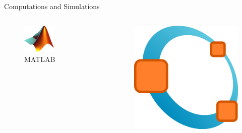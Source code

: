 \documentclass[10pt]{beamer}
\begin{document}
    \begin{frame}{Computations and Simulations}
        \begin{columns}
            \begin{column}{0.5\textwidth}
                \begin{figure}
                    \includegraphics[width=0.5\textwidth]{images/matlab}
                    \caption{MATLAB}
                \end{figure}
            \end{column}
            \vrule{}
            \begin{column}{0.5\textwidth}
                \begin{figure}
                    \includegraphics[height=0.2\paperheight]{images/octave}

\end{figure}
\end{column}
\end{columns}
\end{frame}
\end{document}
